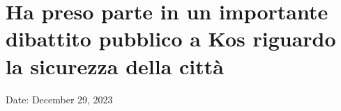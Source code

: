 \section{Ha preso parte in un importante dibattito pubblico a Kos
riguardo la sicurezza della
città}\label{ha-preso-parte-in-un-importante-dibattito-pubblico-a-kos-riguardo-la-sicurezza-della-cittuxe0}

Date: December 29, 2023
